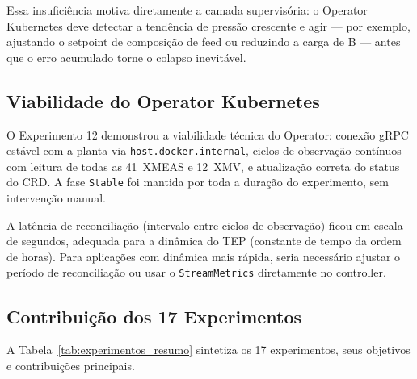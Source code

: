 Essa insuficiência motiva diretamente a camada supervisória: o Operator Kubernetes deve detectar a tendência de pressão crescente e agir — por exemplo, ajustando o setpoint de composição de feed ou reduzindo a carga de B — antes que o erro acumulado torne o colapso inevitável.

\subsection{Viabilidade do Operator Kubernetes}

O Experimento 12 demonstrou a viabilidade técnica do Operator: conexão gRPC estável com a planta via \texttt{host.docker.internal}, ciclos de observação contínuos com leitura de todas as 41~XMEAS e 12~XMV, e atualização correta do status do CRD. A fase \texttt{Stable} foi mantida por toda a duração do experimento, sem intervenção manual.

A latência de reconciliação (intervalo entre ciclos de observação) ficou em escala de segundos, adequada para a dinâmica do TEP (constante de tempo da ordem de horas). Para aplicações com dinâmica mais rápida, seria necessário ajustar o período de reconciliação ou usar o \texttt{StreamMetrics} diretamente no controller.

\subsection{Contribuição dos 17 Experimentos}

A Tabela~\ref{tab:experimentos_resumo} sintetiza os 17 experimentos, seus objetivos e contribuições principais.

